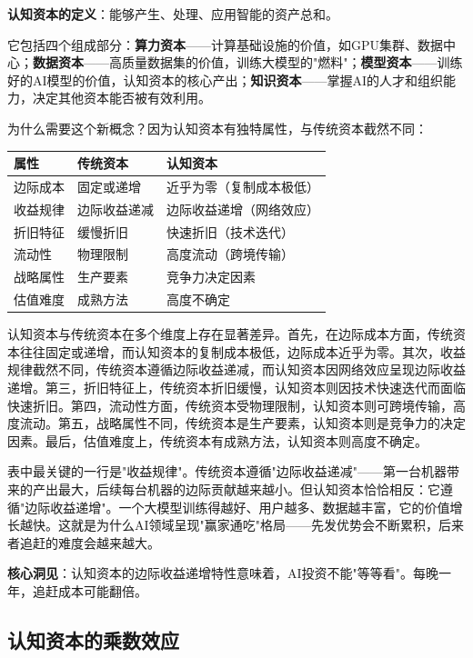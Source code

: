 \textbf{认知资本的定义}：能够产生、处理、应用智能的资产总和。

它包括四个组成部分：\textbf{算力资本}——计算基础设施的价值，如GPU集群、数据中心；\textbf{数据资本}——高质量数据集的价值，训练大模型的"燃料"；\textbf{模型资本}——训练好的AI模型的价值，认知资本的核心产出；\textbf{知识资本}——掌握AI的人才和组织能力，决定其他资本能否被有效利用。

为什么需要这个新概念？因为认知资本有独特属性，与传统资本截然不同：

\begin{center}
\small
\begin{tabular}{|p{3cm}|p{4cm}|p{5cm}|}
\hline
\textbf{属性} & \textbf{传统资本} & \textbf{认知资本} \\
\hline
边际成本 & 固定或递增 & 近乎为零（复制成本极低） \\
\hline
收益规律 & 边际收益递减 & 边际收益递增（网络效应） \\
\hline
折旧特征 & 缓慢折旧 & 快速折旧（技术迭代） \\
\hline
流动性 & 物理限制 & 高度流动（跨境传输） \\
\hline
战略属性 & 生产要素 & 竞争力决定因素 \\
\hline
估值难度 & 成熟方法 & 高度不确定 \\
\hline
\end{tabular}
\end{center}

认知资本与传统资本在多个维度上存在显著差异。首先，在边际成本方面，传统资本往往固定或递增，而认知资本的复制成本极低，边际成本近乎为零。其次，收益规律截然不同，传统资本遵循边际收益递减，而认知资本因网络效应呈现边际收益递增。第三，折旧特征上，传统资本折旧缓慢，认知资本则因技术快速迭代而面临快速折旧。第四，流动性方面，传统资本受物理限制，认知资本则可跨境传输，高度流动。第五，战略属性不同，传统资本是生产要素，认知资本则是竞争力的决定因素。最后，估值难度上，传统资本有成熟方法，认知资本则高度不确定。

表中最关键的一行是"收益规律"。传统资本遵循"边际收益递减"——第一台机器带来的产出最大，后续每台机器的边际贡献越来越小。但认知资本恰恰相反：它遵循"边际收益递增"。一个大模型训练得越好、用户越多、数据越丰富，它的价值增长越快。这就是为什么AI领域呈现"赢家通吃"格局——先发优势会不断累积，后来者追赶的难度会越来越大。

\textbf{核心洞见}：认知资本的边际收益递增特性意味着，AI投资不能"等等看"。每晚一年，追赶成本可能翻倍。

\subsection{认知资本的乘数效应}

